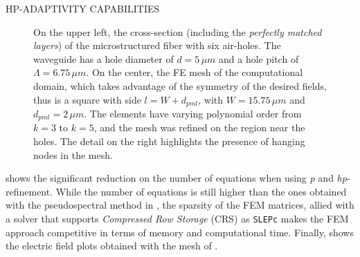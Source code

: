 \documentclass[debug]{beamer} %
\begin{document}
\begin{frame}
\begin{minipage}[t]{0.45\textwidth}
\begin{block}{\boxnumber HP-ADAPTIVITY CAPABILITIES }
\begin{figure}
	    	    \caption{On the upper left, the cross-section (including the \emph{perfectly matched layers}) of the microstructured fiber with six air-holes. The waveguide has a hole diameter of $d = 5\,\mu m$ and a hole pitch of $\Lambda=6.75\,\mu m$. On the center, the FE mesh of the computational domain, which takes advantage of the symmetry of the desired fields, thus is a square with side $l=W+d_{pml}$, with $W=15.75\,\mu m$ and $d_{pml} = 2\, \mu m$. The elements have varying polynomial order from $k=3$ to $k=5$, and the mesh was refined on the region near the holes. The detail on the right highlights the presence of hanging nodes in the mesh.}
	    	    \label{fig:mesh-holey}
	    	\end{figure}    	
			 shows the significant reduction on the number of equations when using \emph{p} and \emph{hp}-refinement. While the number of equations is still higher than the ones obtained with the pseudospectral method in \textcite{chiang11}, the sparsity of the FEM matrices, allied with a solver that supports \emph{Compressed Row Storage} (CRS) as \texttt{SLEPc}\parencite{slepc05} makes the FEM approach competitive in terms of memory and computational time. Finally,  shows the electric field plots obtained with the mesh of .


\end{block}
\end{minipage}
\end{frame}
\end{document}
